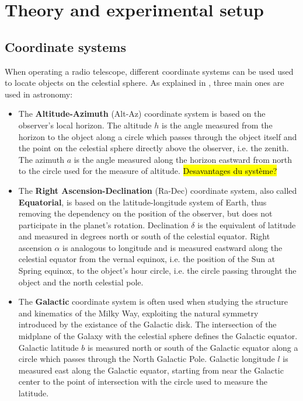 \section{Theory and experimental setup}
\subsection{Coordinate systems}
When operating a radio telescope, different coordinate systems can be used used to locate objects on the celestial sphere.
As explained in \cite{carroll_introduction_2007}, three main ones are used in astronomy:
\begin{itemize}
    \item The \textbf{Altitude-Azimuth} (Alt-Az) coordinate system is based on the observer's local horizon. The altitude $h$ is the angle measured from the horizon to the object along a circle which passes through the object itself and the point on the celestial sphere directly above the observer, i.e. the zenith. The azimuth $a$ is the angle measured along the horizon eastward from north to the circle used for the measure of altitude. \hl{Desavantages du système?} \cite{carroll_introduction_2007}
    \item The \textbf{Right Ascension-Declination} (Ra-Dec) coordinate system, also called \textbf{Equatorial}, is based on the latitude-longitude system of Earth, thus removing the dependency on the position of the observer, but does not participate in the planet's rotation. Declination $\delta$ is the equivalent of latitude and measured in degrees north or south of the celestial equator. Right ascension $\alpha$ is analogous to longitude and is measured eastward along the celestial equator from the vernal equinox, i.e. the position of the Sun at Spring equinox, to the object's hour circle, i.e. the circle passing throught the object and the north celestial pole.
    \item The \textbf{Galactic} coordinate system is often used when studying the structure and kinematics of the Milky Way, exploiting the natural symmetry introduced by the existance of the Galactic disk. The intersection of the midplane of the Galaxy with the celestial sphere defines the Galactic equator. Galactic latitude $b$ is measured north or south of the Galactic equator along a circle which passes through the North Galactic Pole. Galactic longitude $l$ is measured east along the Galactic equator, starting from near the Galactic center to the point of intersection with the circle used to measure the latitude.
\end{itemize}
